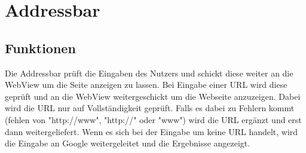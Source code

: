 

\section{Addressbar}
\subsection{Funktionen}
Die Addressbar prüft die Eingaben des Nutzers und schickt diese weiter an die WebView um die Seite anzeigen zu lassen.
Bei Eingabe einer URL wird diese geprüft und an die WebView weitergeschickt um die Webseite anzuzeigen.
Dabei wird die URL nur auf Vollständigkeit geprüft. Falls es dabei zu Fehlern kommt (fehlen von "http://www", "http://" oder "www")
wird die URL ergänzt und erst dann weitergeliefert.
Wenn es sich bei der Eingabe um keine URL handelt, wird die Eingabe an Google weitergeleitet und die Ergebnisse angezeigt.

